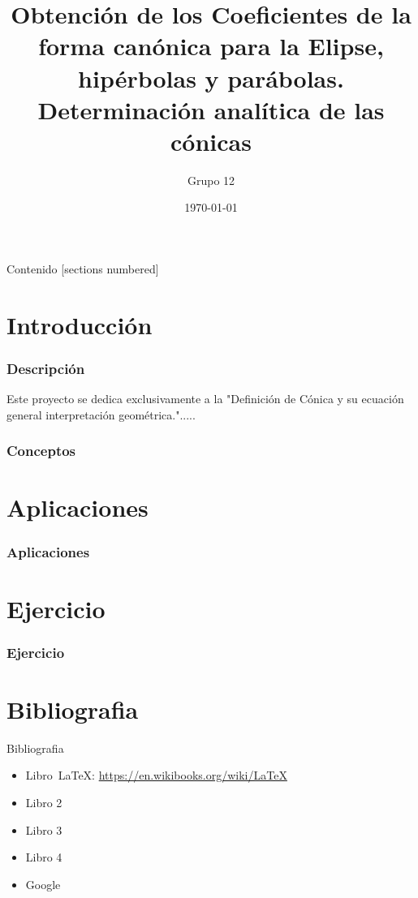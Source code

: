 \documentclass{beamer}
\title{Obtención de los Coeficientes de la forma canónica para la Elipse, hipérbolas y parábolas. \newline
Determinación analítica de las cónicas}
\author{Grupo 12}
\date{\today}
\begin{document}
\maketitle

\begin{frame}{Contenido}
    [sections numbered]
    \tableofcontents[hideallsubsections]
\end{frame}

\section{Introducción}
\begin{frame}
    \frametitle{Descripción}
    Este proyecto se dedica exclusivamente a la "Definición de
    Cónica y su ecuación general interpretación geométrica.".....
\end{frame}

\begin{frame}
    \frametitle{Conceptos}
    \lipsum[1-1]
\end{frame}

\section{Aplicaciones}
\begin{frame}
    \frametitle{Aplicaciones}
    \lipsum[1-1]
\end{frame}

\section{Ejercicio}
\begin{frame}
    \frametitle{Ejercicio}
    \lipsum[1-1]
\end{frame}

\section{Bibliografia}
\begin{frame}{Bibliografia}
\begin{itemize}
    \item Libro~\LaTeX: \url{https://en.wikibooks.org/wiki/LaTeX}
    \item Libro 2
    \item Libro 3
    \item Libro 4
    \item \alert{Google}
\end{itemize}
\end{frame}
  
\end{document}
